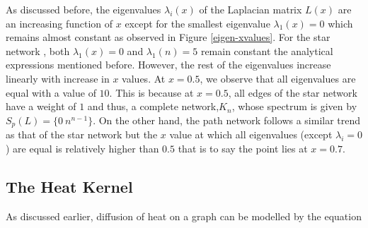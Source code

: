 \documentclass[10pt,a4paper]{article}
\begin{document}
        As discussed before, the eigenvalues $\lambda_i(x)$ of the Laplacian matrix $L(x)$ are an increasing function of $x$ except for the smallest eigenvalue $\lambda_1(x) = 0$ which remains almost constant as observed in Figure \ref{eigen-xvalues}. For the star network , both $\lambda_1(x) = 0$ and $\lambda_1(n) = 5$ remain constant the analytical expressions mentioned before. However, the rest of the eigenvalues increase linearly with increase in $x$ values. At $x=0.5$, we observe that all eigenvalues are equal with a value of $10$. This is because at $x=0.5$, all edges of the star network have a weight of $1$ and thus, a complete network,$K_n$, whose spectrum is given by $S_p(L) = \{0~ n^{n-1} \}$. On the other hand, the path network follows a similar trend as that of the star network but the $x$ value at which all eigenvalues (except $\lambda_i=0$) are equal is relatively higher than $0.5$ that is to say the point lies at $x=0.7$. 
        
        \newpage
        
        
        \subsection{The Heat Kernel}
        As discussed earlier, diffusion of heat on a graph can be modelled by the equation 
        
\end{document}
